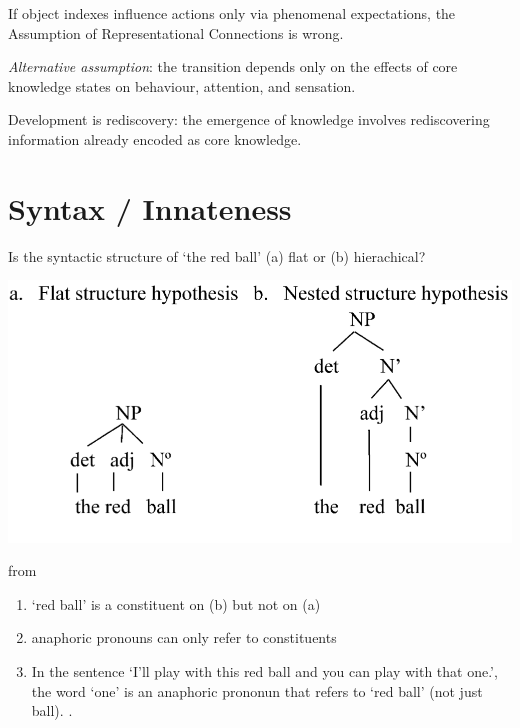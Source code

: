 \documentclass[12pt]{extarticle}
\begin{document}
\begin{multicols}{3}
If object indexes influence actions only via phenomenal expectations, the Assumption of Representational Connections is wrong.

\emph{Alternative assumption}: the transition depends only on the effects of core knowledge states on behaviour, attention, and sensation.

Development is rediscovery: the emergence of knowledge involves rediscovering information already encoded as core knowledge.



\section{Syntax / Innateness}

Is the syntactic structure of ‘the red ball’ (a) flat or (b) hierachical?

\begin{center}

\includegraphics[scale=0.25]{../www.slides/src/raw/img/lidz_2003_fig0.neg.png}

\end{center}

\begin{center} from \citealp{lidz:2003_what} \end{center}

\begin{enumerate}



\item ‘red ball’ is a constituent on (b) but not on (a)


\item anaphoric pronouns can only refer to constituents



                \item In the sentence ‘I’ll play with this red ball and you can play with that one.’, the word ‘one’ is an anaphoric prononun that refers to ‘red ball’ (not just ball).
                \citep{lidz:2003_what,lidz:2004_reaffirming}.





\end{enumerate}
\end{multicols}
\end{document}
